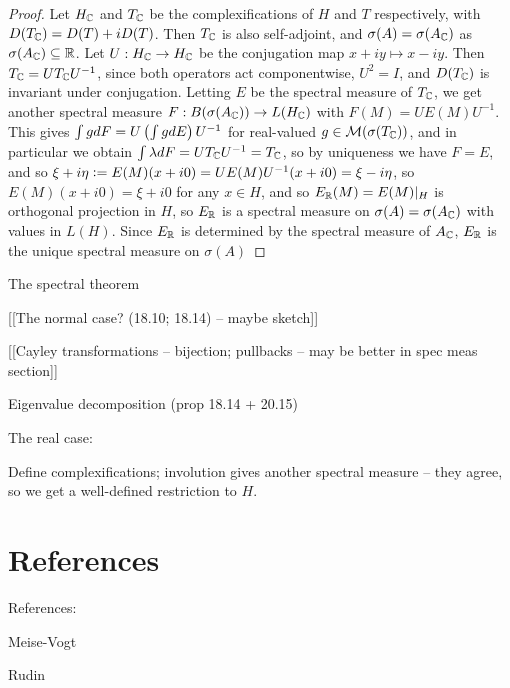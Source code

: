 \documentclass[10pt]{amsart}
\begin{document}
\begin{proof}
    Let $H_{\mathbb{C}}$ and $T_{\mathbb{C}}$ be the complexifications of $H$ and $T$ respectively, with $D(T_{\mathbb{C}}) = D(T) + iD(T)$. Then $T_{\mathbb{C}}$ is also self-adjoint, and $\sigma(A) = \sigma(A_{\mathbb{C}})$ as $\sigma(A_{\mathbb{C}}) \subseteq \mathbb{R}$. Let $U : H_{\mathbb{C}} \to H_{\mathbb{C}}$ be the conjugation map $x + iy \mapsto x - iy$. Then $T_{\mathbb{C}} = UT_{\mathbb{C}} U^{-1}$, since both operators act componentwise, $U^2 = I$, and $D(T_{\mathbb{C}})$ is invariant under conjugation. Letting $E$ be the spectral measure of $T_{\mathbb{C}}$, we get another spectral measure $F : B(\sigma(A_{\mathbb{C}})) \to L(H_{\mathbb{C}})$ with $F(M) = UE(M)U^{-1}$. This gives $\int g dF = U\left(  \int g dE  \right)U^{-1}$ for real-valued $g \in \mathcal{M}(\sigma(T_{\mathbb{C}}))$, and in particular we obtain $\int \lambda dF = UT_{\mathbb{C}} U^{-1} = T_{\mathbb{C}}$, so by uniqueness we have $F = E$, and so $\xi + i \eta \vcentcolon= E(M)(x + i0) = UE(M)U^{-1}(x + i0) = \xi - i \eta$, so $E(M)(x + i0) = \xi + i0$ for any $x \in H$, and so $E_{\mathbb{R}}(M) = E(M)|_H$ is orthogonal projection in $H$, so $E_{\mathbb{R}}$ is a spectral measure on $\sigma(A) = \sigma(A_{\mathbb{C}})$ with values in $L(H)$. Since $E_{\mathbb{R}}$ is determined by the spectral measure of $A_{\mathbb{C}}$, $E_{\mathbb{R}}$ is the unique spectral measure on $\sigma(A)$
\end{proof} %

The spectral theorem

[[The normal case? (18.10; 18.14) -- maybe sketch]]

[[Cayley transformations -- bijection; pullbacks -- may be better in spec meas section]]



Eigenvalue decomposition (prop 18.14 + 20.15)

The real case:

Define complexifications; involution gives another spectral measure -- they agree, so we get a well-defined restriction to $H$.

\section{References}
References:

Meise-Vogt

Rudin
\end{document}
